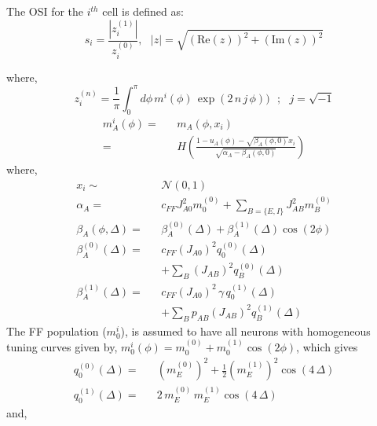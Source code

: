 \newcommand{\mZero}{m_E^{(0)}}
\newcommand{\mOne}{m_E^{(1)}}
\newcommand{\zZero}{z^{(0)}}
\newcommand{\zOne}{z^{(1)}}

The OSI for the $i^{th}$ cell is defined as: 
\begin{equation}
s_{i} = \frac{| \zOne_i |}{ \zZero_i}, \,\,\,\, |z| = \sqrt{(\mathrm{Re}(z))^2 + (\mathrm{Im}(z))^2}
\label{defosi}
\end{equation}

where,\\
\begin{equation}
z_i^{(n)} = \frac{1}{\pi} \int_0^{\pi} d \phi \,  m^i(\phi) \, \exp (2 \, n \,  j \, \phi)) \,\,\,\,; \,\,\,\, j = \sqrt{-1}
\end{equation}
\begin{eqnarray}
m_A^i(\phi) =&& m_A(\phi, x_i)\\
=&& H\left(\frac{1 - u_A(\phi) - \sqrt{\beta_A(\phi, 0)} x_i}{\sqrt{\alpha_A - \beta_A(\phi, 0)}} \right)
\end{eqnarray}
where,
\begin{eqnarray}
x_i \sim&& \mathcal{N}(0, 1)\nonumber \\
\alpha_A =&& c_{FF} J_{A0}^2 m_0^{(0)} +  \sum_{B = \lbrace E, I\rbrace}  J_{AB}^2 m_B^{(0)}\\ %
\beta_A(\phi, \Delta) =&& \beta^{(0)}_A(\Delta) + \beta^{(1)}_A(\Delta)  \cos(2 \phi)\\
\beta_A^{(0)}(\Delta) =&& c_{FF} (J_{A0})^2 q_0^{(0)} (\Delta)\nonumber \\ 
&&+ \sum_B  \left(J_{AB}\right)^2 q_B^{(0)}(\Delta) \\
\beta_A^{(1)}(\Delta) =&& c_{FF} (J_{A0})^2 \, \gamma \, q_0^{(1)} (\Delta)\nonumber \\
&&+ \sum_B  p_{AB} \left(J_{AB}\right)^2  q_B^{(1)}(\Delta)
\end{eqnarray}
The FF population ($m^i_0$), is assumed to have all neurons with homogeneous tuning curves given by, $m^i_0(\phi) = m^{(0)}_0 + m^{(1)}_0 \cos(2 \phi)$, which gives
\begin{eqnarray}
q^{(0)}_0 (\Delta) =&&(\mZero)^2 + \frac{1}{2} (\mOne)^2 \cos(4 \, \Delta) \\
q^{(1)}_0 (\Delta) =&& 2 \, \mZero \, \mOne \cos(4 \, \Delta) 
\end{eqnarray}
and, \\


